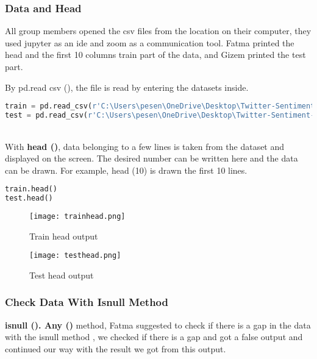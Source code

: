 \documentclass[onecolumn]{article}
\begin{document}
\subsubsection{ Data and Head}

All group members opened the csv files from the location on their computer, they used jupyter as an ide and zoom as a communication tool. Fatma  printed the head and the first 10 columns train part of the data, and Gizem printed the test part.

By pd.read csv (), the file is read by entering the datasets inside.

\begin{lstlisting}[language=Python, caption= data]
train = pd.read_csv(r'C:\Users\pesen\OneDrive\Desktop\Twitter-Sentiment-Analysis-master\train_tweet.csv')
test = pd.read_csv(r'C:\Users\pesen\OneDrive\Desktop\Twitter-Sentiment-Analysis-master\test_tweets.csv')
\end{lstlisting}

\\

With \textbf{head ()}, data belonging to a few lines is taken from the dataset and displayed on the screen. The desired number can be written here and the data can be drawn. For example, head (10) is drawn the first 10 lines.

\begin{lstlisting}[language=Python, caption= head]
train.head()
test.head()
\end{lstlisting}



\begin{figure}[ht!]
\centering
\texttt{[image: trainhead.png]}
\caption{ Train head output\label{}}
\end{figure}

\begin{figure}[ht!]
\centering
\texttt{[image: testhead.png]}
\caption{Test head output \label{}}
\end{figure}

\subsubsection{Check Data With Isnull Method}

\textbf{isnull (). Any ()} method, Fatma suggested to check if there is a gap in the data with the isnull method , we checked if there is a gap and got a false output and continued our way with the result we got from this output. 
\end{document}
